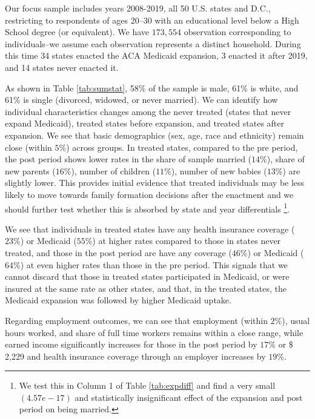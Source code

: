 \documentclass{article}
\begin{document}
Our focus sample includes years 2008-2019, all 50 U.S. states and D.C., restricting to respondents of ages 20--30 with an educational level below a High School degree (or equivalent). We have $173,554$ observation corresponding to individuals--we assume each observation represents a distinct household. During this time 34 states enacted the ACA Medicaid expansion, 3 enacted it after 2019, and 14 states never enacted it.

As shown in Table \ref{tab:sumstat}, 58\% of the sample is male, 61\% is white, and 61\% is single (divorced, widowed, or never married). We can identify how individual characteristics changes among the never treated (states that never expand Medicaid), treated states before expansion, and treated states after expansion. We see that basic demographics (sex, age, race and ethnicity) remain close (within $5\%$) across groups. In treated states, compared to the pre period, the post period shows lower rates in the share of sample married ($14\%$), share of new parents ($16\%$), number of children ($11\%$), number of new babies ($13\%$) are slightly lower. This provides initial evidence that treated individuals may be less likely to move towards family formation decisions after the enactment and we should further test whether this is absorbed by state and year differentials \footnote{We test this in Column 1 of Table \ref{tab:expdiff} and find a very small $(4.57e-17)$ and statistically insignificant effect of the expansion and post period on being married.}.

We see that individuals in treated states have any health insurance coverage ($23\%$) or Medicaid ($55\%$) at higher rates compared to those in states never treated, and those in the post period are have any coverage ($46\%$) or Medicaid ($64\%$) at even higher rates than those in the pre period. This signals that we cannot discard that those in treated states participated in Medicaid, or were insured at the same rate as other states, and that, in the treated states, the Medicaid expansion was followed by higher Medicaid uptake. %

Regarding employment outcomes, we can see that employment (within $2\%$), usual hours worked, and share of full time workers remains within a close range, while earned income significantly increases for those in the post period by $17\%$ or $\$$2,229 and health insurance coverage through an employer increases by $19\%$.
\end{document}
